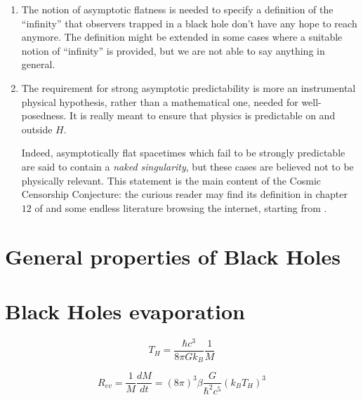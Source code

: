 \begin{remark}
	\begin{enumerate}[label=(\Roman*)]
		\item The notion of asymptotic flatness is needed to specify a definition of the ``infinity'' that observers trapped in a black hole don't have any hope to reach anymore. The definition might be extended in some cases where a suitable notion of ``infinity'' is provided, but we are not able to say anything in general.
		\item The requirement for strong asymptotic predictability is more an instrumental physical hypothesis, rather than a mathematical one, needed for well-posedness. It is really meant to ensure that physics is predictable on and outside \(H\).
		
		Indeed, asymptotically flat spacetimes which fail to be strongly predictable are said to contain a \emph{naked singularity}, but these cases are believed not to be physically relevant. This statement is the main content of the Cosmic Censorship Conjecture: the curious reader may find its definition in chapter \(12\) of \cite{wald2010general} and some endless literature browsing the internet, starting from \cite{dias2018strong}.
	\end{enumerate}
\end{remark}


\section{General properties of Black Holes}

\section{Black Holes evaporation}
\label{sec:black-holes-evaporation}

\begin{equation}
	\label{eq:hawking-temperature}
	T_H = \frac{\hbar c^3}{8\pi Gk_B}\frac{1}{M}
\end{equation}

\begin{equation}
	\label{eq:evaporation rate}
	R_{ev} = \frac{1}{M}\frac{dM}{dt} = (8\pi)^3\beta \frac{G}{\hbar^2c^5}\left(k_BT_H\right)^3
\end{equation}

